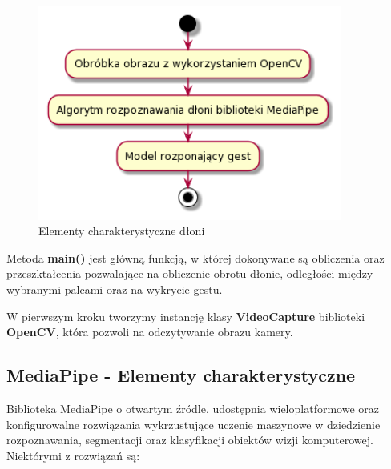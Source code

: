     \begin{figure}[H]
        \begin{center}
            \includegraphics[width=10cm]{../images/image_processing.png}
            \caption{Elementy charakterystyczne dłoni}
        \end{center}
    \end{figure}

    \quad Metoda \textbf{main()} jest główną funkcją, w której dokonywane są obliczenia oraz przeszktałcenia pozwalające na obliczenie obrotu dłonie, odległości między wybranymi palcami oraz na wykrycie gestu. 
    
    
    
    \quad W pierwszym kroku tworzymy instancję klasy \textbf{VideoCapture} biblioteki \textbf{OpenCV}, która pozwoli na odczytywanie obrazu kamery. 
    
    
    
    
    \subsection{MediaPipe - Elementy charakterystyczne}
    
    \quad Biblioteka MediaPipe o otwartym źródle, udostępnia wieloplatformowe oraz konfigurowalne rozwiązania wykrzustujące uczenie maszynowe w dziedzienie rozpoznawania, segmentacji oraz klasyfikacji obiektów wizji komputerowej. Niektórymi z rozwiązań są:
    
